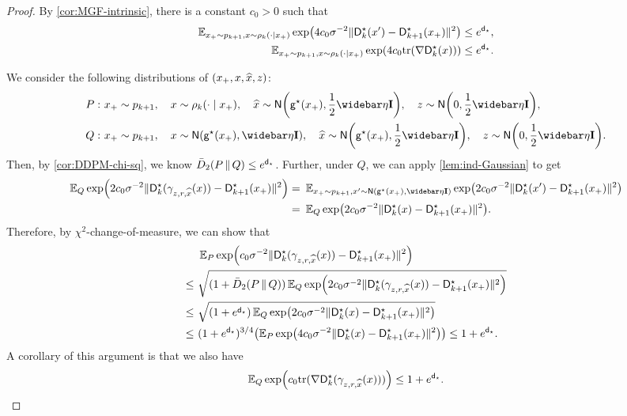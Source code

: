 \begin{proof}
By \cref{cor:MGF-intrinsic}, there is a constant $c_0>0$ such that
\begin{align*}
    \En_{x_+\sim p_{k+1}, x\sim \rho_k(\cdot\mid x_+)}\exp\prn*{ 4c_0\sigma^{-2}\nrm{\Ds_k(x')-\Ds_{k+1}(x_+)}^2 }\leq e^{\dbar}, \\
    \En_{x_+\sim p_{k+1}, x\sim \rho_k(\cdot\mid x_+)}\exp\prn*{ 4c_0\tr(\nabla \Ds_k(x)) }\leq e^{\dbar}.
\end{align*}

We consider the following distributions of $(x_+,x,\widehat{x},z)$:
\begin{align*}
    P:&~  x_+\sim p_{k+1}, \quad x\sim \rho_k(\cdot\mid x_+), \quad \xhat\sim \normal{\gds(x_+),\frac12\etabar\Id}, \quad z\sim \normal{0,\frac12\etabar\Id}, \\
    Q:&~  x_+\sim p_{k+1}, \quad x\sim \normal{\gds(x_+),\etabar\Id}, \quad \xhat\sim \normal{\gds(x_+),\frac12\etabar\Id}, \quad z\sim \normal{0,\frac12\etabar\Id}.
\end{align*}
Then, by \cref{cor:DDPM-chi-sq}, we know $\Dsys[2]{P}{Q}\leq e^{\dbar}$. Further, under $Q$, we can apply \cref{lem:ind-Gaussian} to get
\begin{align*}
    \En_Q\exp\prn*{ 2c_0\sigma^{-2}\nrm{\Ds_k(\gamma_{z,r,\xhat}(x))-\Ds_{k+1}(x_+)}^2 }
    =&~\En_{x_+\sim p_{k+1}, x'\sim \normal{\gds(x_+),\etabar\Id}}\exp\prn*{ 2c_0\sigma^{-2}\nrm{\Ds_k(x')-\Ds_{k+1}(x_+)}^2 } \\
    =&~ \En_Q\exp\prn*{ 2c_0\sigma^{-2}\nrm{\Ds_k(x)-\Ds_{k+1}(x_+)}^2 }.
\end{align*}
Therefore, by $\chi^2$-change-of-measure, we can show that
\begin{align*}
    &~\En_P\exp\prn*{ c_0\sigma^{-2}\nrm{\Ds_k(\gamma_{z,r,\xhat}(x))-\Ds_{k+1}(x_+)}^2 } \\
    \leq&~ \sqrt{(1+\Dsys[2]{P}{Q})\En_Q\exp\prn*{ 2c_0\sigma^{-2}\nrm{\Ds_k(\gamma_{z,r,\xhat}(x))-\Ds_{k+1}(x_+)}^2 } } \\
    \leq&~ \sqrt{(1+e^{\dbar})\En_Q\exp\prn*{ 2c_0\sigma^{-2}\nrm{\Ds_k(x)-\Ds_{k+1}(x_+)}^2 } } \\
    \leq&~ (1+e^{\dbar})^{3/4} \prn*{ \En_P\exp\prn*{ 4c_0\sigma^{-2}\nrm{\Ds_k(x)-\Ds_{k+1}(x_+)}^2 } }
    \leq 1+e^{\dbar}.
\end{align*}
A corollary of this argument is that we also have
\begin{align*}
    \En_Q\exp\prn*{c_0\tr(\nabla \Ds_k(\gamma_{z,r,\xhat}(x)))}\leq 1+e^{\dbar}.
\end{align*}

\end{proof}
